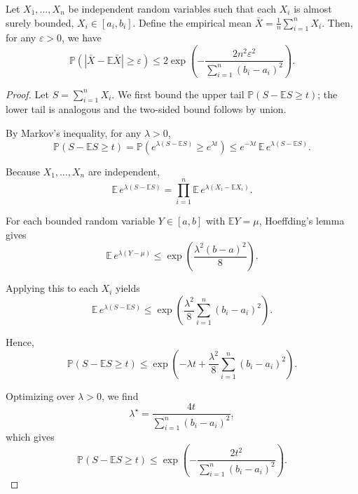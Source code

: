 \documentclass[../main]{subfiles}
\begin{document}
\begin{theorem}
Let $X_1, \dots, X_n$ be independent random variables such that each $X_i$ is almost surely bounded, $X_i \in [a_i, b_i]$.  
Define the empirical mean $\bar{X} = \frac{1}{n}\sum_{i=1}^n X_i$. Then, for any $\varepsilon > 0$, we have
\begin{equation}
    \mathbb{P}\!\left(|\bar{X} - \mathbb{E}\bar{X}| \ge \varepsilon\right)
    \le 2\exp\left(-\frac{2n^2\varepsilon^2}{\sum_{i=1}^n (b_i - a_i)^2}\right).
\end{equation}
\end{theorem}
\begin{proof}
    Let $S = \sum_{i=1}^n X_i$. We first bound the upper tail $\mathbb{P}(S - \mathbb{E}S \ge t)$; the lower tail is analogous and the two-sided bound follows by union.
    
    By Markov's inequality, for any $\lambda > 0$,
    \begin{equation}
    \mathbb{P}(S - \mathbb{E}S \ge t)
    = \mathbb{P}\!\left(e^{\lambda(S - \mathbb{E}S)} \ge e^{\lambda t}\right)
    \le e^{-\lambda t}\,\mathbb{E}\,e^{\lambda(S - \mathbb{E}S)}.
    \end{equation}
    
    Because $X_1,\dots,X_n$ are independent,
    \begin{equation}
    \mathbb{E}\,e^{\lambda(S - \mathbb{E}S)}
    = \prod_{i=1}^n \mathbb{E}\,e^{\lambda(X_i - \mathbb{E}X_i)}.
    \end{equation}
    
    For each bounded random variable $Y \in [a,b]$ with $\mathbb{E}Y = \mu$, Hoeffding's lemma gives
    \begin{equation}
    \mathbb{E}\,e^{\lambda(Y - \mu)} \le \exp\left(\frac{\lambda^2(b - a)^2}{8}\right).
    \end{equation}
    
    Applying this to each $X_i$ yields
    \begin{equation}
    \mathbb{E}\,e^{\lambda(S - \mathbb{E}S)}
    \le \exp\left(\frac{\lambda^2}{8}\sum_{i=1}^n (b_i - a_i)^2\right).
    \end{equation}
    
    Hence,
    \begin{equation}
    \mathbb{P}(S - \mathbb{E}S \ge t)
    \le \exp\left(-\lambda t + \frac{\lambda^2}{8}\sum_{i=1}^n (b_i - a_i)^2\right).
    \end{equation}
    
    Optimizing over $\lambda > 0$, we find
    \begin{equation}
    \lambda^\star = \frac{4t}{\sum_{i=1}^n (b_i - a_i)^2},
    \end{equation}
    which gives
    \begin{equation}
    \mathbb{P}(S - \mathbb{E}S \ge t)
    \le \exp\left(-\frac{2t^2}{\sum_{i=1}^n (b_i - a_i)^2}\right).
    \end{equation}
    

\end{proof}
\end{document}

